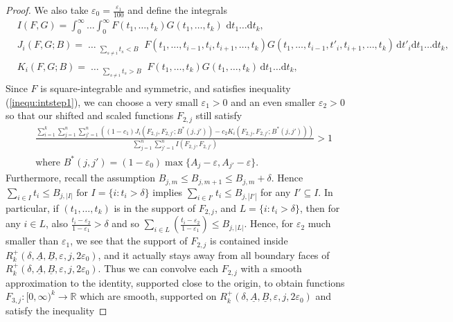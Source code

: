 \documentclass{amsart}
\numberwithin{equation}{section}
\begin{document}
\begin{proof}
We also take $\varepsilon_0 = \frac{\varepsilon_1}{100}$ and define the integrals 
\begin{align*} 
&I(F,G)=\int_0^\infty \dots \int_0^\infty F(t_1, \dots, t_k)G(t_1, \dots, t_k) \,\, \mbox{d}t_1 \dots \mbox{d}t_k, \\
&J_i(F,G;B)=  \mathop{\int_0^\infty \dots \int_0^\infty}_{\substack{\sum_{s \neq i } t_s < B   }}  F(t_1,\dots, t_{i-1}, t_i, t_{i+1}, \dots, t_k)  G(t_1, \dots, t_{i-1}, t'_i, t_{i+1}, \dots, t_k) \,  \mbox{d}t'_i\mbox{d}t_1 \dots  \mbox{d}t_k, \\
&K_i(F,G;B)=  \mathop{\int_0^\infty \dots \int_0^\infty}_{\substack{\sum_{s \neq i } t_s > B   }}  F(t_1,\dots, t_k)  G(t_1, \dots, t_k) \, \mbox{d}t_1 \dots  \mbox{d}t_k, 
\end{align*} 
 Since  $F$ is square-integrable and symmetric, and satisfies inequality  (\ref{inequ:intstep1}), we can choose a very small  $\varepsilon_1>0$   and  an even smaller $\varepsilon_2>0$ so that our shifted and scaled functions $F_{2,j}$ still satisfy 
\begin{align}\label{inequ:proofstep2}
&\frac{\sum_{i=1}^k\sum_{j=1}^n \sum_{j'=1}^n ( (1-c_1) J_i(F_{2,j},F_{2,j'};B^*(j,j')) - c_2 K_i(F_{2,j},F_{2,j'};B^*(j,j'))) }{\sum_{j=1}^n \sum_{j'=1}^n I(F_{2,j},F_{2,j'})} > 1 \\
&\mbox{where } B^*(j,j')=(1-\varepsilon_0)\max\{A_j-\varepsilon,A_{j'}-\varepsilon\}. \nonumber
\end{align}
Furthermore, recall  the assumption  $B_{j,m} \leq B_{j,m+1} \leq B_{j,m}+\delta$. Hence $\sum_{i \in I} t_i \leq B_{j,|I|} \mbox{ for }  I=\{i: t_i > \delta\}$   implies $\sum_{i \in I'} t_i \leq B_{j,|I'|}$ for any $I' \subseteq I$. In particular, if $(t_1, \dots, t_k)$ is in the support of $F_{2,j}$, and $L=\{i:t_i>\delta\}$, then for any $i \in L$,  also $\frac{t_i-\varepsilon_2}{1-\varepsilon_1} > \delta$ and so $\sum_{i \in L} (\frac{t_i-\varepsilon_2}{1-\varepsilon_1}) \leq B_{j,|L|}$. Hence, for $\varepsilon_2$ much smaller than $\varepsilon_1$, we see that the support of  $F_{2,j}$ is   contained inside $R_k^+(\delta,\underline{A},\underline{B},\varepsilon,j,2\varepsilon_0)$, and it actually  stays away from all boundary faces of $R_k^+(\delta,\underline{A},\underline{B},\varepsilon,j,2\varepsilon_0)$.   Thus we can convolve each $F_{2,j}$ with a smooth approximation to the identity, supported close to the origin, to obtain   functions $F_{3,j}:[0,\infty)^k \rightarrow \mathbb{R}$ which are smooth, supported on  $R_k^+(\delta,\underline{A},\underline{B},\varepsilon,j,2\varepsilon_0)$ and  satisfy the inequality

\end{proof}
\end{document}
